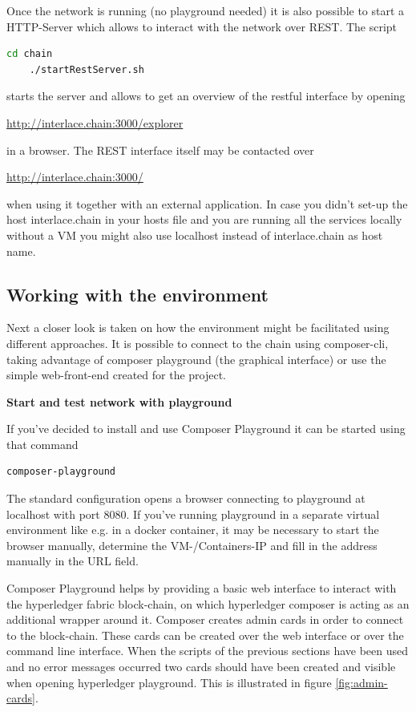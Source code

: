 Once the network is running (no playground needed) it is also possible to start a HTTP-Server which allows to interact with the network over REST. The script

\begin{lstlisting}[language=bash]
	cd chain
	./startRestServer.sh
\end{lstlisting}

starts the server and allows to get an overview of the restful interface by opening

\url{http://interlace.chain:3000/explorer}

in a browser. The REST interface itself may be contacted over

\url{http://interlace.chain:3000/}

when using it together with an external application. In case you didn't set-up the host interlace.chain in your hosts file and you are running all the services locally without a VM you might also use localhost instead of interlace.chain as host name.

\subsection{Working with the environment}

Next a closer look is taken on how the environment might be facilitated using different approaches. It is possible to connect to the chain using composer-cli, taking advantage of composer playground (the graphical interface) or use the simple web-front-end created for the project.

\textbf{Start and test network with playground}

If you've decided to install and use Composer Playground it can be started using that command

\begin{lstlisting}[language=bash]
	composer-playground
\end{lstlisting}

The standard configuration opens a browser connecting to playground at localhost with port 8080. If you've running playground in a separate virtual environment like e.g. in a docker container, it may be necessary to start the browser manually, determine the VM-/Containers-IP and fill in the address manually in the URL field.

Composer Playground helps by providing a basic web interface to interact with the hyperledger fabric block-chain, on which hyperledger composer is acting as an additional wrapper around it. Composer creates admin cards in order to connect to the block-chain. These cards can be created over the web interface or over the command line interface. When the scripts of the previous sections have been used and no error messages occurred two cards should have been created and visible when opening hyperledger playground. This is illustrated in figure \ref{fig:admin-cards}.

